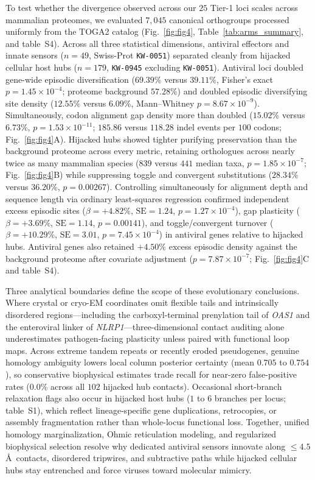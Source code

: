 \documentclass[12pt]{article}
\begin{document}
To test whether the divergence observed across our $25$ Tier-1 loci scales across mammalian proteomes, we evaluated $7,045$ canonical orthogroups processed uniformly from the TOGA2 catalog \cite{kirilenko2023integrating,kosakovsky2026walrus} (Fig.~\ref{fig:fig4}, Table~\ref{tab:arms_summary}, and table~S4). Across all three statistical dimensions, antiviral effectors and innate sensors ($n = 49$, Swiss-Prot \texttt{KW-0051}) separated cleanly from hijacked cellular host hubs ($n = 179$, \texttt{KW-0945} excluding \texttt{KW-0051}). Antiviral loci doubled gene-wide episodic diversification ($69.39\%$ versus $39.11\%$, Fisher's exact $p = 1.45 \times 10^{-4}$; proteome background $57.28\%$) and doubled episodic diversifying site density ($12.55\%$ versus $6.09\%$, Mann--Whitney $p = 8.67 \times 10^{-9}$). Simultaneously, codon alignment gap density more than doubled ($15.02\%$ versus $6.73\%$, $p = 1.53 \times 10^{-11}$; $185.86$ versus $118.28$ indel events per $100$ codons; Fig.~\ref{fig:fig4}A). Hijacked hubs showed tighter purifying preservation than the background proteome across every metric, retaining orthologues across nearly twice as many mammalian species ($839$ versus $441$ median taxa, $p = 1.85 \times 10^{-7}$; Fig.~\ref{fig:fig4}B) while suppressing toggle and convergent substitutions ($28.34\%$ versus $36.20\%$, $p = 0.00267$). Controlling simultaneously for alignment depth and sequence length via ordinary least-squares regression confirmed independent excess episodic sites ($\beta = +4.82\%$, $\mathrm{SE} = 1.24$, $p = 1.27 \times 10^{-4}$), gap plasticity ($\beta = +3.69\%$, $\mathrm{SE} = 1.14$, $p = 0.00141$), and toggle/convergent turnover ($\beta = +10.29\%$, $\mathrm{SE} = 3.01$, $p = 7.45 \times 10^{-4}$) in antiviral genes relative to hijacked hubs. Antiviral genes also retained $+4.50\%$ excess episodic density against the background proteome after covariate adjustment ($p = 7.87 \times 10^{-7}$; Fig.~\ref{fig:fig4}C and table~S4).

Three analytical boundaries define the scope of these evolutionary conclusions. Where crystal or cryo-EM coordinates omit flexible tails and intrinsically disordered regions---including the carboxyl-terminal prenylation tail of \textit{OAS1} and the enteroviral linker of \textit{NLRP1}---three-dimensional contact auditing alone underestimates pathogen-facing plasticity unless paired with functional loop maps. Across extreme tandem repeats or recently eroded pseudogenes, genuine homology ambiguity lowers local column posterior certainty (mean $0.705$ to $0.754$), so conservative biophysical estimates trade recall for near-zero false-positive rates ($0.0\%$ across all $102$ hijacked hub contacts). Occasional short-branch relaxation flags also occur in hijacked host hubs ($1$ to $6$ branches per locus; table~S1), which reflect lineage-specific gene duplications, retrocopies, or assembly fragmentation rather than whole-locus functional loss. Together, unified homology marginalization, Ohmic reticulation modeling, and regularized biophysical selection resolve why dedicated antiviral sensors innovate along $\le 4.5$\,\AA\ contacts, disordered tripwires, and subtractive paths while hijacked cellular hubs stay entrenched and force viruses toward molecular mimicry.
\end{document}
